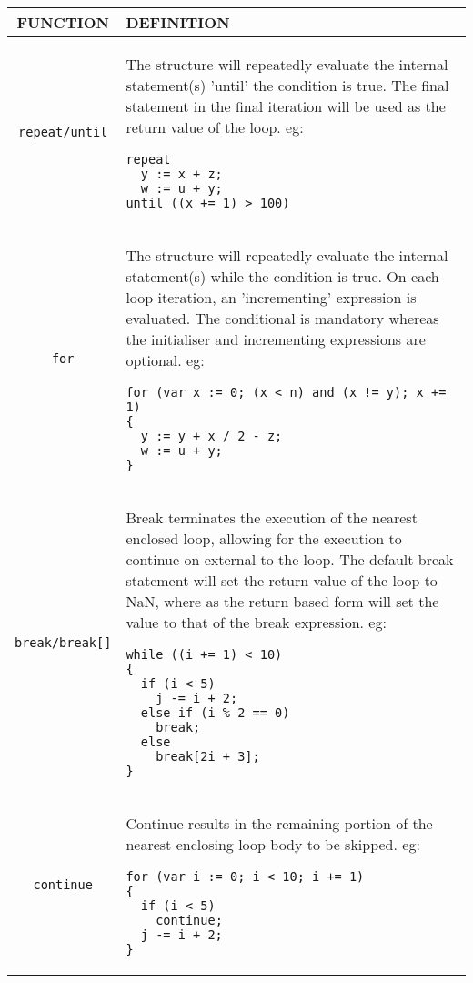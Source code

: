 \begin{tabular}{|c|p{}|}
\hline
FUNCTION& DEFINITION\\
\hline
\verb'repeat/until'& The structure will repeatedly evaluate the internal
statement(s) 'until' the condition is true. The final
statement in the final iteration will be used as the 
return value of the loop.                            
eg:
\begin{verbatim}
repeat                                               
  y := x + z;                                        
  w := u + y;                                        
until ((x += 1) > 100)                               
\end{verbatim}
\\
\verb'for'& The structure will repeatedly evaluate the internal    
statement(s) while the condition is true. On each loop
iteration, an 'incrementing' expression is evaluated. 
The conditional is mandatory whereas the initialiser  
and incrementing expressions are optional.            
eg:                                                   
\begin{verbatim}
for (var x := 0; (x < n) and (x != y); x += 1)        
{                                                     
  y := y + x / 2 - z;                                 
  w := u + y;                                         
}            
\end{verbatim}
\\
\verb'break/break[]'& Break terminates the execution of the nearest enclosed 
loop, allowing for the execution to continue on external
to the loop. The default break statement will set the   
return value of the loop to NaN, where as the return    
based form will set the value to that of the break      
expression.                                             
eg:
\begin{verbatim}
while ((i += 1) < 10)                                   
{                                                       
  if (i < 5)                                            
    j -= i + 2;                                         
  else if (i % 2 == 0)                                  
    break;                                              
  else                                                  
    break[2i + 3];                                      
}            
\end{verbatim}
\\
\verb'continue'& Continue results in the remaining portion of the nearest
enclosing loop body to be skipped.
eg:
\begin{verbatim}
for (var i := 0; i < 10; i += 1)  
{                                 
  if (i < 5)                      
    continue;                     
  j -= i + 2;                     
}            
\end{verbatim}
  \\
  \hline
\end{tabular}

